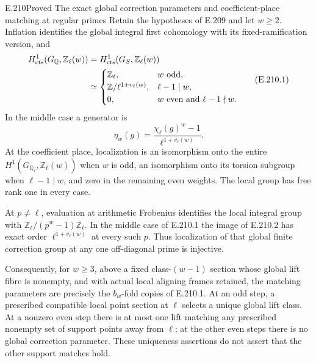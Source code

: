 \begin{result}{E.210}{Proved}
{The exact global correction parameters and coefficient-place matching at regular primes}
Retain the hypotheses of E.209 and let $w\ge2$. Inflation
identifies the global integral first cohomology with its
fixed-ramification version, and
\[
 \begin{aligned}
 H^1_{\rm cts}(G_{\mathbb Q},\mathbb Z_\ell(w))
 &=H^1_{\rm cts}(G_S,\mathbb Z_\ell(w))\\
 &\simeq
 \begin{cases}
  \mathbb Z_\ell,&w\text{ odd},\\
  \mathbb Z/\ell^{1+v_\ell(w)},&\ell-1\mid w,\\
  0,&w\text{ even and }\ell-1\nmid w.
 \end{cases}
 \end{aligned}                                                \tag{E.210.1}
\]
In the middle case a generator is
\[
              \eta_w(g)=\frac{\chi_\ell(g)^w-1}
                               {\ell^{1+v_\ell(w)}}.           \tag{E.210.2}
\]
At the coefficient place, localization is an isomorphism
onto the entire $H^1(G_{\mathbb Q_\ell},\mathbb Z_\ell(w))$
when $w$ is odd, an isomorphism onto its torsion subgroup
when $\ell-1\mid w$, and zero in the remaining even weights.
The local group has free rank one in every case.

At $p\ne\ell$, evaluation at arithmetic Frobenius identifies
the local integral group with
$\mathbb Z_\ell/(p^w-1)\mathbb Z_\ell$.
In the middle case of E.210.1 the image of E.210.2 has exact
order $\ell^{1+v_\ell(w)}$ at every such $p$.
Thus localization of that global finite correction group
at any one off-diagonal prime is injective.

Consequently, for $w\ge3$, above a fixed class-$(w-1)$
section whose global lift fibre is nonempty, and with
actual local aligning frames retained, the matching
parameters are precisely the $b_w$-fold copies of
E.210.1. At an odd step, a prescribed compatible local
point section at $\ell$ selects a unique global lift class.
At a nonzero even step there is at most one lift matching
any prescribed nonempty set of support points away from
$\ell$; at the other even steps there is no global
correction parameter. These uniqueness assertions do not
assert that the other support matches hold.
\end{result}


